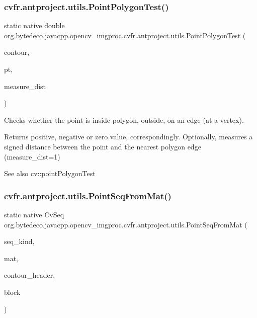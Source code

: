\subsubsection{\texorpdfstring{cv\+fr.antproject.utils.Point\+Polygon\+Test()}{cvPointPolygonTest()}}
{\footnotesize\ttfamily static native double org.\+bytedeco.\+javacpp.\+opencv\+\_\+imgproc.\+cv\+fr.antproject.utils.Point\+Polygon\+Test (\begin{DoxyParamCaption}\item[{@Const Cv\+Arr}]{contour,  }\item[{@By\+Val Cv\+Point2\+D32f}]{pt,  }\item[{int}]{measure\+\_\+dist }\end{DoxyParamCaption})\hspace{0.3cm}{\ttfamily [static]}}



Checks whether the point is inside polygon, outside, on an edge (at a vertex). 

Returns positive, negative or zero value, correspondingly. Optionally, measures a signed distance between the point and the nearest polygon edge (measure\+\_\+dist=1) \begin{DoxySeeAlso}{See also}
cv\+::point\+Polygon\+Test 
\end{DoxySeeAlso}
\mbox{\label{group__imgproc__c_ga75ebb68fece47bfb144af0ad2a86668e}} 
\subsubsection{\texorpdfstring{cv\+fr.antproject.utils.Point\+Seq\+From\+Mat()}{cvPointSeqFromMat()}}
{\footnotesize\ttfamily static native Cv\+Seq org.\+bytedeco.\+javacpp.\+opencv\+\_\+imgproc.\+cv\+fr.antproject.utils.Point\+Seq\+From\+Mat (\begin{DoxyParamCaption}\item[{int}]{seq\+\_\+kind,  }\item[{@Const Cv\+Arr}]{mat,  }\item[{Cv\+Contour}]{contour\+\_\+header,  }\item[{Cv\+Seq\+Block}]{block }\end{DoxyParamCaption})\hspace{0.3cm}{\ttfamily [static]}}



